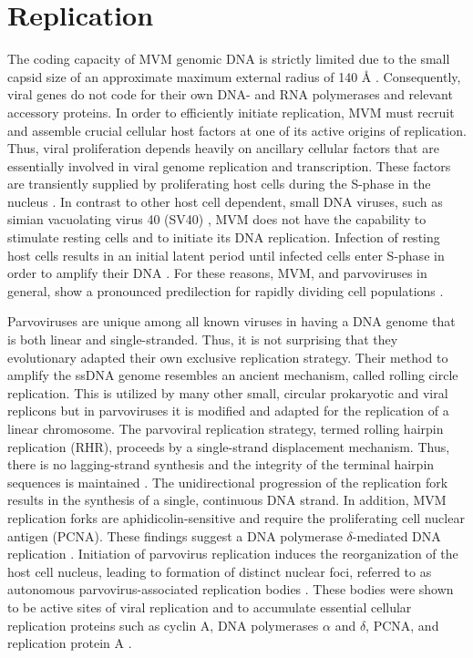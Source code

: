 \section{Replication}
\label{Replication}
The coding capacity of MVM genomic DNA is strictly limited due to the small capsid size of an approximate maximum external radius of 140 \r{A} \cite{pmid15299974}. Consequently, viral genes do not code for their own DNA- and RNA polymerases and relevant accessory proteins. In order to efficiently initiate replication, MVM must recruit and assemble crucial cellular host factors at one of its active origins of replication. Thus, viral proliferation depends heavily on ancillary cellular factors that are essentially involved in viral genome replication and transcription. These factors are transiently supplied by proliferating host cells during the S-phase in the nucleus \cite{pmid16789120, pmid6602221, pmid3005655, pmid3296697, pmid9418888, pmid4673484, S-phase}. In contrast to other host cell dependent, small DNA viruses, such as simian vacuolating virus 40 (SV40) \cite{pmid4291013, pmid16578647}, MVM does not have the capability to stimulate resting cells and to initiate its DNA replication. Infection of resting host cells results in an initial latent period until infected cells enter S-phase in order to amplify their DNA \cite{pmid4673484, pmid3346950, pmid10792046}. For these reasons, MVM, and parvoviruses in general, show a pronounced predilection for rapidly dividing cell populations \cite{pmid3296697}. 

Parvoviruses are unique among all known viruses in having a DNA genome that is both linear and single-stranded. Thus, it is not surprising that they evolutionary adapted their own exclusive replication strategy. Their method to amplify the ssDNA genome resembles an ancient mechanism, called rolling circle replication. This is utilized by many other small, circular prokaryotic and viral replicons \cite{pmid1630899, pmid8374079, pmid8824773, pmid9092519, pmid9010307} but in parvoviruses it is modified and adapted for the replication of a linear chromosome. The parvoviral replication strategy, termed rolling hairpin replication (RHR), proceeds by a single-strand displacement mechanism. Thus, there is no lagging-strand synthesis and the integrity of the terminal hairpin sequences is maintained \cite{pmid967244}. The unidirectional progression of the replication fork results in the synthesis of a single, continuous DNA strand. In addition, MVM replication forks are aphidicolin-sensitive and require the proliferating cell nuclear antigen (PCNA). These findings suggest a DNA polymerase $\delta$-mediated DNA replication \cite{pmid10792046, pmid12050365, pmid9525597}. Initiation of parvovirus replication induces the reorganization of the host cell nucleus, leading to formation of distinct nuclear foci, referred to as autonomous parvovirus-associated replication bodies \cite{pmid11287588, pmid10775619, pmid11907229}. These bodies were shown to be active sites of viral replication and to accumulate essential cellular replication proteins such as cyclin A, DNA polymerases $\alpha$ and $\delta$, PCNA, and replication protein A \cite{pmid10792046}. 

